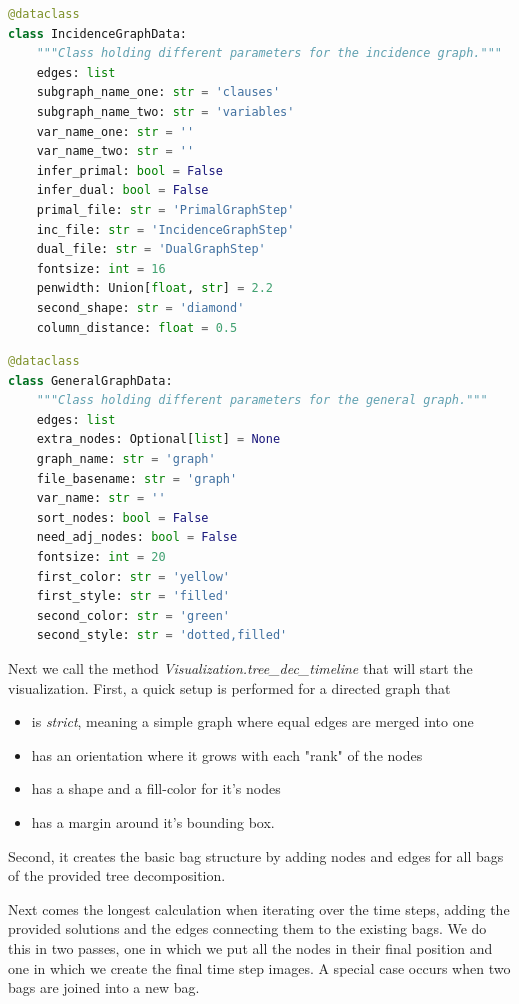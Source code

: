 \documentclass[a4paper, 12pt, bibliography=totoc]{scrartcl}
\begin{document}
\begin{lstlisting}[language={Python}, caption={IncidenceGraphData}, label={lst:incidencedata}]
@dataclass
class IncidenceGraphData:
	"""Class holding different parameters for the incidence graph."""
	edges: list
	subgraph_name_one: str = 'clauses'
	subgraph_name_two: str = 'variables'
	var_name_one: str = ''
	var_name_two: str = ''
	infer_primal: bool = False
	infer_dual: bool = False
	primal_file: str = 'PrimalGraphStep'
	inc_file: str = 'IncidenceGraphStep'
	dual_file: str = 'DualGraphStep'
	fontsize: int = 16
	penwidth: Union[float, str] = 2.2
	second_shape: str = 'diamond'
	column_distance: float = 0.5	
\end{lstlisting}

\begin{lstlisting}[language={Python}, caption={GeneralGraphData}, label={lst:gengraphdata}]
@dataclass
class GeneralGraphData:
	"""Class holding different parameters for the general graph."""
	edges: list
	extra_nodes: Optional[list] = None
	graph_name: str = 'graph'
	file_basename: str = 'graph'
	var_name: str = ''
	sort_nodes: bool = False
	need_adj_nodes: bool = False
	fontsize: int = 20
	first_color: str = 'yellow'
	first_style: str = 'filled'
	second_color: str = 'green'
	second_style: str = 'dotted,filled'
\end{lstlisting}

Next we call the method \textit{Visualization.tree\_dec\_timeline} that will start the visualization.
First, a quick setup is performed for a directed graph that 
\begin{itemize}
	\item is \textit{strict}, meaning a simple graph where equal edges are merged into one
	\item has an orientation where it grows with each "rank" of the nodes
	\item has a shape and a fill-color for it's nodes
	\item has a margin around it's bounding box.
\end{itemize}

Second, it creates the basic bag structure by adding nodes and edges for all bags of the provided tree decomposition.

Next comes the longest calculation when iterating over the time steps, adding the provided solutions and the edges connecting them to the existing bags. We do this in two passes, one in which we put all the nodes in their final position and one in which we create the final time step images. A special case occurs when two bags are joined into a new bag.
\end{document}
